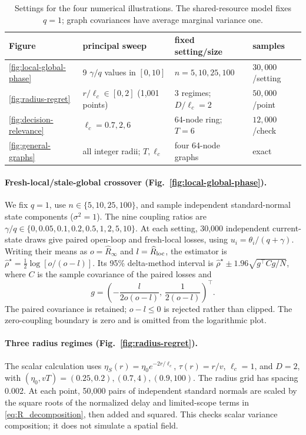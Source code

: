 \begin{table}[H]
\centering
\caption{Settings for the four numerical illustrations. The shared-resource
model fixes $q=1$; graph covariances have average marginal variance one.}
\label{tab:numerical-parameters}
\small
\begin{tabular}{llll}
\toprule
Figure & principal sweep & fixed setting/size & samples \\
\midrule
\ref{fig:local-global-phase} & 9 $\gamma/q$ values in $[0,10]$ & $n=5,10,25,100$ & $30{,}000$/setting \\
\ref{fig:radius-regret} & $r/\ell_c\in[0,2]$ (1,001 points) & 3 regimes; $D/\ell_c=2$ & $50{,}000$/point \\
\ref{fig:decision-relevance} & $\ell_c=0.7,2,6$ & 64-node ring; $T=6$ & $12{,}000$/check \\
\ref{fig:general-graphs} & all integer radii; $T,\ell_c$ & four 64-node graphs & exact \\
\bottomrule
\end{tabular}
\end{table}

\paragraph{Fresh-local/stale-global crossover (Fig.~\ref{fig:local-global-phase}).}
We fix $q=1$, use $n\in\{5,10,25,100\}$, and sample independent
standard-normal state components ($\sigma^2=1$).
The nine coupling ratios are $\gamma/q\in\{0,0.05,0.1,0.2,0.5,1,2,5,10\}$.
At each setting, 30,000 independent current-state draws give paired open-loop and fresh-local
losses, using $u_i=\theta_i/(q+\gamma)$.
Writing their means as $o=\widehat R_\infty$ and
$l=\widehat R_{\rm loc}$, the estimator is
$\widehat\rho^\star=\tfrac12\log[o/(o-l)]$.
Its 95\% delta-method interval is
$\widehat\rho^\star\pm1.96\sqrt{g^\top Cg/N}$, where $C$ is the sample
covariance of the paired losses and
\[
g=\left(-\frac{l}{2o(o-l)},\,\frac{1}{2(o-l)}\right)^\top.
\]
The paired covariance is retained; $o-l\le0$ is rejected rather than clipped.
The zero-coupling boundary is zero and is omitted from the logarithmic plot.

\paragraph{Three radius regimes (Fig.~\ref{fig:radius-regret}).}
The scalar calculation uses $\eta_S(r)=\eta_0e^{-2r/\ell_c}$,
$\tau(r)=r/v$, $\ell_c=1$, and $D=2$, with
$(\eta_0,vT)=(0.25,0.2),(0.7,4),(0.9,100)$.
The radius grid has spacing 0.002. At each point, 50,000 pairs of independent
standard normals are scaled by the square roots of the normalized delay and limited-scope terms in
\eqref{eq:R_decomposition}, then added
and squared. This checks scalar variance composition; it does not simulate
a spatial field.

